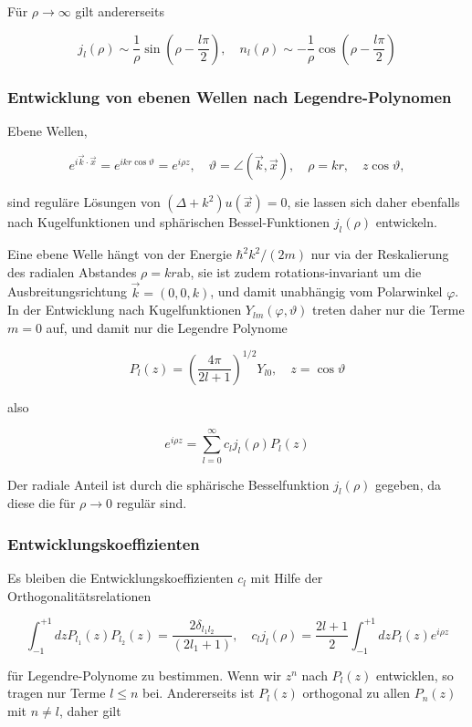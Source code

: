 \documentclass[10pt, letterpaper]{article}
\begin{document}
Für $\rho \rightarrow \infty$ gilt andererseits

$$
j_{l}(\rho) \sim \frac{1}{\rho} \sin \left(\rho-\frac{l \pi}{2}\right), \quad n_{l}(\rho) \sim-\frac{1}{\rho} \cos \left(\rho-\frac{l \pi}{2}\right)
$$

\subsubsection*{Entwicklung von ebenen Wellen nach Legendre-Polynomen}
Ebene Wellen,

$$
e^{i \vec{k} \cdot \vec{x}}=e^{i k r \cos \vartheta}=e^{i \rho z}, \quad \vartheta=\angle(\vec{k}, \vec{x}), \quad \rho=k r, \quad z \cos \vartheta,
$$

sind reguläre Lösungen von $\left(\Delta+k^{2}\right) u(\vec{x})=0$, sie lassen sich daher ebenfalls nach Kugelfunktionen und sphärischen Bessel-Funktionen $j_{l}(\rho)$ entwickeln.

Eine ebene Welle hängt von der Energie $\hbar^{2} k^{2} /(2 m)$ nur via der Reskalierung des radialen Abstandes $\rho=k r \mathrm{ab}$, sie ist zudem rotations-invariant um die Ausbreitungsrichtung $\vec{k}=(0,0, k)$, und damit unabhängig vom Polarwinkel $\varphi$. In der Entwicklung nach Kugelfunktionen $Y_{l m}(\varphi, \vartheta)$ treten daher nur die Terme $m=0$ auf, und damit nur die Legendre Polynome

$$
P_{l}(z)=\left(\frac{4 \pi}{2 l+1}\right)^{1 / 2} Y_{l 0}, \quad z=\cos \vartheta
$$

also

$$
e^{i \rho z}=\sum_{l=0}^{\infty} c_{l} j_{l}(\rho) P_{l}(z)
$$

Der radiale Anteil ist durch die sphärische Besselfunktion $j_{l}(\rho)$ gegeben, da diese die für $\rho \rightarrow 0$ regulär sind.

\subsubsection*{Entwicklungskoeffizienten}
Es bleiben die Entwicklungskoeffizienten $c_{l}$ mit Hilfe der Orthogonalitätsrelationen

$$
\int_{-1}^{+1} d z P_{l_{1}}(z) P_{l_{2}}(z)=\frac{2 \delta_{l_{1} l_{2}}}{\left(2 l_{1}+1\right)}, \quad c_{l} j_{l}(\rho)=\frac{2 l+1}{2} \int_{-1}^{+1} d z P_{l}(z) e^{i \rho z}
$$

für Legendre-Polynome zu bestimmen. Wenn wir $z^{n}$ nach $P_{l}(z)$ entwicklen, so tragen nur Terme $l \leq n$ bei. Andererseits ist $P_{l}(z)$ orthogonal zu allen $P_{n}(z)$ mit $n \neq l$, daher gilt
\end{document}
